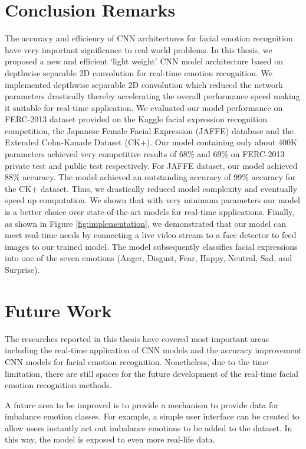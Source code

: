 \documentclass[master]{thesis-uestc}
\begin{document}
\section{Conclusion Remarks}
The accuracy and efficiency of CNN architectures for facial emotion recognition have very important significance to real world problems. In this thesis, we proposed a new and efficient `light weight' CNN model architecture based on depthwise separable 2D convolution for real-time emotion recognition. We implemented depthwise separable 2D convolution which reduced the network parameters drastically thereby accelerating the overall performance speed making it suitable for real-time application. We evaluated our model performance on FERC-2013 dataset provided on the Kaggle facial expression recognition competition, the Japanese Female Facial Expression (JAFFE) database and the Extended Cohn-Kanade Dataset (CK+). Our model containing only about 400K parameters achieved very competitive results of 68\% and 69\% on FERC-2013 private test and public test respectively. For JAFFE dataset, our model achieved 88\% accuracy. The model achieved an outstanding accuracy of 99\% accuracy for the CK+ dataset. Thus, we drastically reduced model complexity and eventually speed up computation. We shown that with very minimum parameters our model is a better choice over state-of-the-art models for real-time applications. Finally, as shown in Figure \ref{fig:implementation}, we demonstrated that our model can meet real-time needs by connecting a live video stream to a face detector to feed images to our trained model. The model subsequently classifies facial expressions into one of the seven emotions (Anger, Disgust, Fear, Happy, Neutral, Sad, and Surprise).

\section{Future Work}
The researches reported in this thesis have covered most important areas including the real-time application of CNN models and the accuracy improvement CNN models for facial emotion recognition. Nonetheless, due to the time limitation, there are still spaces for the future development of the real-time facial emotion recognition methods. 

A future area to be improved is to provide a mechanism to provide data for imbalance emotion classes. For example, a simple user interface can be created to allow users instantly act out imbalance emotions to be added to the dataset. In this way, the model is exposed to even more real-life data.
\end{document}

